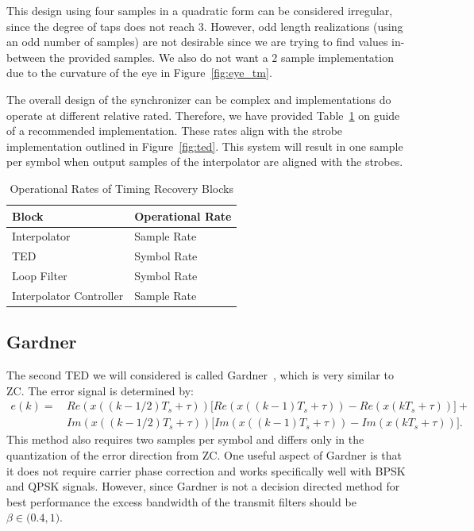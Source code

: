 \documentclass[letterpaper,12pt]{article}
\begin{document}
This design using four samples in a quadratic form can be considered irregular, since the degree of taps does not reach $3$.  However, odd length realizations (using an odd number of samples) are not desirable since we are trying to find values in-between the provided samples.  We also do not want a $2$ sample implementation due to the curvature of the eye in Figure~\ref{fig:eye_tm}.\par 
%
The overall design of the synchronizer can be complex and implementations do operate at different relative rated.  Therefore, we have provided Table~\ref{my-label} on guide of a recommended implementation.  These rates align with the strobe implementation outlined in Figure~\ref{fig:ted}. This system will result in one sample per symbol when output samples of the interpolator are aligned with the strobes.

%
\begin{table}[!ht]
\centering
\caption{Operational Rates of Timing Recovery Blocks}
\label{my-label}
\begin{tabular}{l|l}\hline
 Block & Operational Rate \\ \hline
 Interpolator & Sample Rate \\
 TED & Symbol Rate \\
 Loop Filter & Symbol Rate \\
 Interpolator Controller & Sample Rate 
\end{tabular}
\end{table}
%


\subsection{Gardner}\label{sec:gard}
%
The second TED we will considered is called Gardner~\cite{gardner1986}, which is very similar to ZC.  The error signal is determined by:
%
\begin{equation}\label{eq:ga_ted}
\begin{split}
  e(k) =\, & Re( x((k-1/2)T_s + \tau ) )\big[Re(x((k-1)T_s + \tau )) - Re(x(kT_s + \tau 
))\big] + \\
  &Im( x((k-1/2)T_s + \tau ) )\big[Im(x((k-1)T_s + \tau )) - Im(x(kT_s + \tau ))\big].
\end{split}
\end{equation}
%
This method also requires two samples per symbol and differs only in the quantization of the error direction from ZC.  One useful aspect of Gardner is that it does not require carrier phase correction and works specifically well with BPSK and QPSK signals.  However, since Gardner is not a decision directed method for best performance the excess bandwidth of the transmit filters should be $\beta \in \big(0.4,1\big)$.
\end{document}
